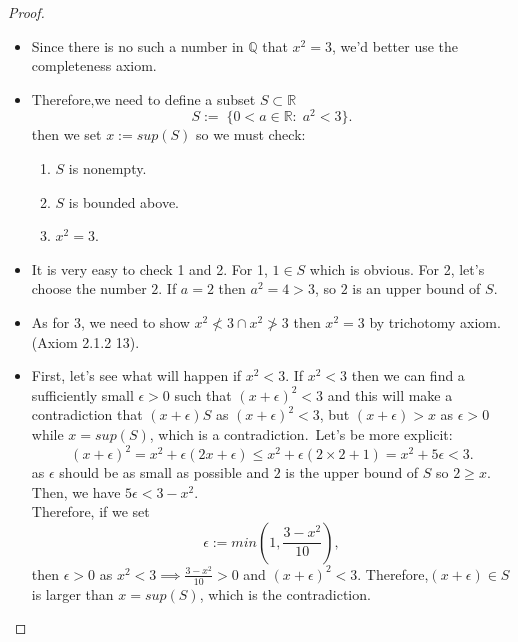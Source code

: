 \documentclass[a4paper]{article}
\def\rr{{\mathbb R}}
\def\qq{{\mathbb Q}}
\begin{document}
\begin{proof}
    \begin{itemize}
        \item Since there is no such a number in $\qq$ that $x^2=3$, we'd better use the completeness axiom.
        \item Therefore,we need to define a subset $S\subset \rr$
        \begin{equation*}
            S:=\;\{0<a\in \rr:\; a^2<3 \}.
        \end{equation*}
        then we set $x:=sup(S)$ so we must check:
        \begin{enumerate}
        \item $S$ is nonempty.
        \item $S$ is bounded above.
        \item $x^2=3$. 
        \end{enumerate}
        \item It is very easy to check 1 and 2. For 1, $1\in S$ which is obvious. 
        For 2, let's choose the number $2$. If $a=2$ then $a^2=4>3$, so $2$ is an upper bound of $S$.
        \item  As for 3, we need to show $x^2 \nless3 \cap x^2 \ngtr 3$ then $x^2=3$ by trichotomy axiom.(Axiom 2.1.2 13).
        \item First, let's see what will happen if $x^2<3$. If $x^2<3$ then we can find a sufficiently small $\epsilon >0$ such that $(x+\epsilon )^2<3$ and this will make a contradiction that $(x+\epsilon) S$ as $(x+\epsilon )^2<3$, but $(x+\epsilon )>x$ as $\epsilon >0$ while $x=sup(S)$, which is a contradiction.\
        Let's be more explicit: \begin{equation*}
            (x+\epsilon )^2=x^2+\epsilon (2x+\epsilon )\leq x^2+\epsilon (2\times 2+1)=x^2+5\epsilon <3.
        \end{equation*}
        as $\epsilon$ should be as small as possible and $2$ is the upper bound of $S$ so $2 \geq x$. Then, we have $5\epsilon < 3-x^2$. \\
         Therefore, if we set 
        \begin{equation*}
            \epsilon := min(1,\frac{3-x^2}{10}),
        \end{equation*}
        then $\epsilon >0$ as $x^2<3 \implies \frac{3-x^2}{10}>0$ and $(x+\epsilon )^2<3$. Therefore,$ (x+\epsilon )\in S$ is larger than $x=sup(S)$, which is the contradiction.
   

\end{itemize}
\end{proof}
\end{document}
